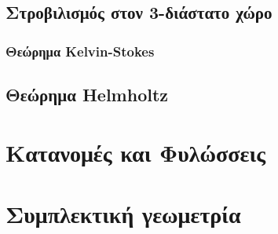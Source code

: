 \documentclass[12pt]{article}
\begin{document}
\subsection{Στροβιλισμός στον 3-διάστατο χώρο}

\subsubsection{Θεώρημα Kelvin-Stokes}

\subsection{Θεώρημα Helmholtz}

\section{Κατανομές και Φυλώσσεις}


\section{Συμπλεκτική γεωμετρία}
\end{document}
